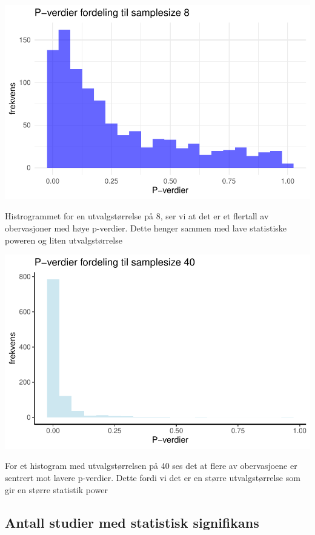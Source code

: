 \documentclass[
  letterpaper,
  DIV=11,
  numbers=noendperiod]{scrreprt}
\begin{document}
\includegraphics{03-statistical-inference_files/figure-pdf/P-verdi histogram SS8-1.pdf}

Histrogrammet for en utvalgstørrelse på 8, ser vi at det er et flertall
av obervasjoner med høye p-verdier. Dette henger sammen med lave
statistiske poweren og liten utvalgstørrelse

\includegraphics{03-statistical-inference_files/figure-pdf/P-verdi histogram SS40-1.pdf}

For et histogram med utvalgstørrelsen på 40 ses det at flere av
obervasjoene er sentrert mot lavere p-verdier. Dette fordi vi det er en
større utvalgstørrelse som gir en større statistik power

\subsection{Antall studier med statistisk
signifikans}\label{antall-studier-med-statistisk-signifikans}
\end{document}
